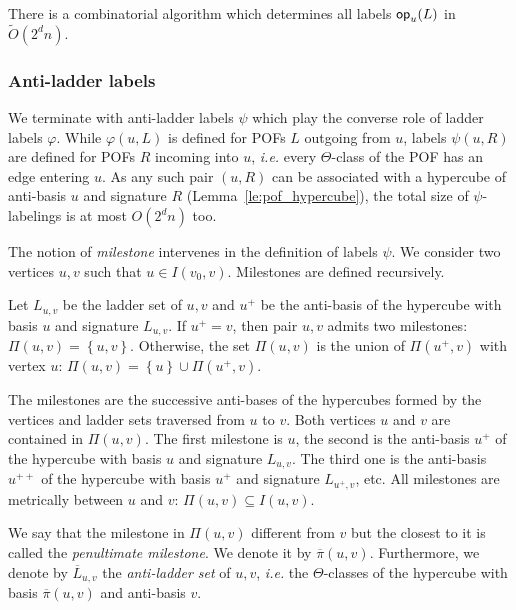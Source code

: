 \documentclass[a4paper,UKenglish,numberwithinsect,cleveref, autoref]{lipics-v2021}
\newcommand{\set}[1]{\left\{ #1 \right\}}
\newcommand{\opp}{\mbox{\textsf{op}}}
\begin{document}
\begin{theorem}[\ref{th:compute_opp}, Computation of labels \opp]
There is a combinatorial algorithm which determines all labels $\opp_u(L)$ in $\tilde{O}(2^dn)$. 
\label{th:compute_opp_teaser}
\end{theorem}

\subsubsection{Anti-ladder labels} \label{subsubsec:anti_ladder}

We terminate with anti-ladder labels $\psi$ which play the converse role of ladder labels $\varphi$. While $\varphi(u,L)$ is defined for POFs $L$ outgoing from $u$, labels $\psi(u,R)$ are defined for POFs $R$ incoming into $u$, {\em i.e.} every $\Theta$-class of the POF has an edge entering $u$. As any such pair $(u,R)$ can be associated with a hypercube of anti-basis $u$ and signature $R$ (Lemma~\ref{le:pof_hypercube}), the total size of $\psi$-labelings is at most $O(2^dn)$ too.

The notion of \textit{milestone} intervenes in the definition of labels $\psi$. We consider two vertices $u,v$ such that $u \in I(v_0,v)$. Milestones are defined recursively.

\begin{definition}[Milestones $\Pi(u,v)$]
Let $L_{u,v}$ be the ladder set of $u,v$ and $u^+$ be the anti-basis of the hypercube with basis $u$ and signature $L_{u,v}$.
If $u^+ = v$, then pair $u,v$ admits two milestones: $\Pi(u,v) = \set{u,v}$. Otherwise, the set $\Pi(u,v)$ is the union of $\Pi(u^+,v)$ with vertex $u$: $\Pi(u,v) = \set{u} \cup \Pi(u^+,v)$.
\label{def:milestones}
\end{definition}

The milestones are the successive anti-bases of the hypercubes formed by the vertices and ladder sets traversed from $u$ to $v$. Both vertices $u$ and $v$ are contained in $\Pi(u,v)$. The first milestone is $u$, the second is the anti-basis $u^+$ of the hypercube with basis $u$ and signature $L_{u,v}$. The third one is the anti-basis $u^{++}$ of the hypercube with basis $u^+$ and signature $L_{u^+,v}$, etc. All milestones are metrically between $u$ and $v$: $\Pi(u,v) \subseteq I(u,v)$. 

\begin{definition}
We say that the milestone in $\Pi(u,v)$ different from $v$ but the closest to it is called the \textit{penultimate milestone}. We denote it by $\overline{\pi}(u,v)$. Furthermore, we denote by $\overline{L}_{u,v}$ the \emph{anti-ladder set} of $u,v$, {\em i.e.} the $\Theta$-classes of the hypercube with basis $\overline{\pi}(u,v)$ and anti-basis $v$. 
\end{definition}
\end{document}
